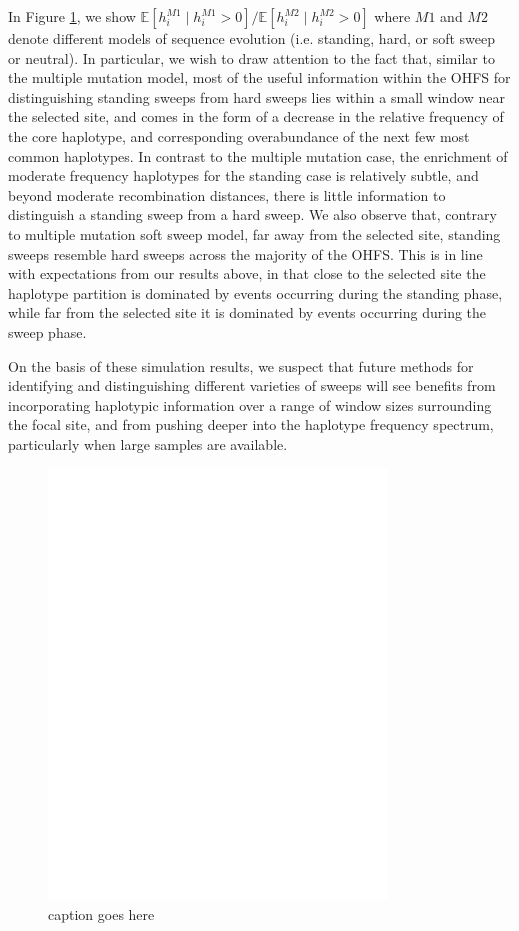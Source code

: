 \documentclass[a4paper,10pt]{article}
\begin{document}
In Figure \ref{hap-freq-ratios}, we show $\mathbb{E}[h_i^{M1} \mid h_i^{M1} > 0]/\mathbb{E}[h_i^{M2} \mid h_i^{M2} > 0]$ where $M1$ and $M2$ denote different models of sequence evolution (i.e. standing, hard, or soft sweep or neutral). In particular, we wish to draw attention to the fact that, similar to the multiple mutation model, most of the useful information within the OHFS for distinguishing standing sweeps from hard sweeps lies within a small window near the selected site, and comes in the form of a decrease in the relative frequency of the core haplotype, and corresponding overabundance of the next few most common haplotypes. In contrast to the multiple mutation case, the enrichment of moderate frequency haplotypes for the standing case is relatively subtle, and beyond moderate recombination distances, there is little information to distinguish a standing sweep from a hard sweep. We also observe that, contrary to multiple mutation soft sweep model, far away from the selected site, standing sweeps resemble hard sweeps across the majority of the OHFS. This is in line with expectations from our results above, in that close to the selected site the haplotype partition is dominated by events occurring during the standing phase, while far from the selected site it is dominated by events occurring during the sweep phase.

On the basis of these simulation results, we suspect that future methods for identifying and distinguishing different varieties of sweeps will see benefits from incorporating haplotypic information over a range of window sizes surrounding the focal site, and from pushing deeper into the haplotype frequency spectrum, particularly when large samples are available. 

\begin{figure}
	\includegraphics[width = 0.8\textwidth]{../Paper_Figures/HapFreqRatiosCondExist.pdf} 
	\caption{caption goes here} \label{hap-freq-ratios}
\end{figure}
\end{document}
